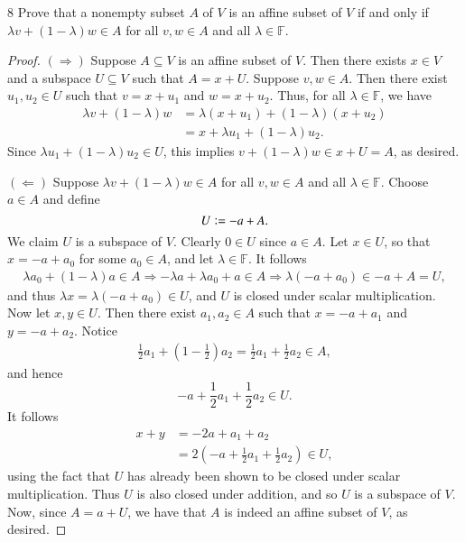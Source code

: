 \documentclass{extarticle}
\newenvironment{problem}[1]{\begin{prob*}{#1}{}}{\end{prob*}}
\newcommand{\F}{\mathbb{F}}
\newcommand{\defeq}{\vcentcolon=}
\begin{document}
\begin{problem}{8}
Prove that a nonempty subset $A$ of $V$ is an affine subset of $V$ if and only if $\lambda v + (1 - \lambda)w\in A$ for all $v,w\in A$ and all $\lambda \in \F$.
\end{problem}
\begin{proof}
$(\Rightarrow)$ Suppose $A\subseteq V$ is an affine subset of $V$.  Then there exists $x\in V$ and a subspace $U\subseteq V$ such that $A = x + U$.  Suppose $v,w \in A$.  Then there exist $u_1,u_2\in U$ such that $v = x + u_1$ and $w = x + u_2$.  Thus, for all $\lambda \in \F$, we have
\begin{align*}
\lambda v + (1 - \lambda) w &= \lambda( x+  u_1) + (1 - \lambda)(x + u_2)\\
&= x + \lambda u_1 + (1 - \lambda)u_2.
\end{align*}
Since $\lambda u_1 + (1 - \lambda)u_2 \in U$, this implies $ v + (1 - \lambda) w\in x + U = A$, as desired.
\par $(\Leftarrow)$ Suppose $\lambda v + (1 - \lambda)w\in A$ for all $v,w\in A$ and all $\lambda \in \F$.  Choose $a \in A$ and define
\begin{equation*}
U \defeq -a + A.
\end{equation*}
We claim $U$ is a subspace of $V$.  Clearly $0\in U$ since $a\in A$.  Let $x \in U$, so that $x = -a + a_0$ for some $a_0\in A$, and let $\lambda\in \F$.  It follows
\begin{align*}
\lambda a_0 + (1 - \lambda)a \in A \Rightarrow -\lambda a +\lambda a_0 + a \in A \Rightarrow \lambda(-a + a_0)\in -a + A = U,
\end{align*}
and thus $\lambda x = \lambda(-a + a_0)\in U$, and $U$ is closed under scalar multiplication.  Now let $x, y\in U$.  Then there exist $a_1,a_2\in A$ such that $x = -a + a_1$ and $y = -a + a_2$. Notice 
\begin{align*}
\frac{1}{2}a_1 + \left(1 - \frac{1}{2}\right)a_2 = \frac{1}{2}a_1 + \frac{1}{2}a_2 \in A,
\end{align*}
and hence 
\begin{equation*}
-a + \frac{1}{2}a_1 + \frac{1}{2}a_2 \in U.
\end{equation*}
It follows
\begin{align*}
x + y &= -2a + a_1 + a_2\\
&= 2\left(-a + \frac{1}{2}a_1 + \frac{1}{2}a_2\right)\in U,
\end{align*}
using the fact that $U$ has already been shown to be closed under scalar multiplication.  Thus $U$ is also closed under addition, and so $U$ is a subspace of $V$.  Now, since $A = a + U$, we have that $A$ is indeed an affine subset of $V$, as desired.
\end{proof}
\end{document}
